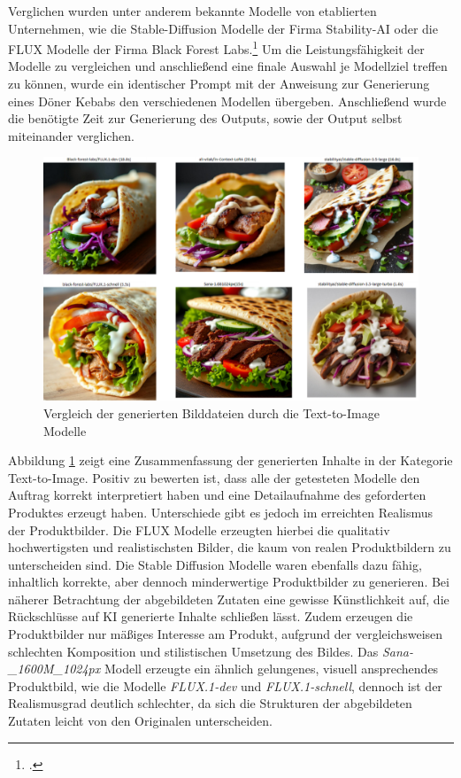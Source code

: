 Verglichen wurden unter anderem bekannte Modelle von etablierten Unternehmen, wie die Stable-Diffusion Modelle der Firma Stability-AI oder die FLUX Modelle der Firma Black Forest Labs.\footcite{stabilityai,blackforestlabs}
Um die Leistungsfähigkeit der Modelle zu vergleichen und anschließend eine finale Auswahl je Modellziel treffen zu können, wurde ein identischer Prompt mit der Anweisung zur Generierung eines Döner Kebabs den verschiedenen Modellen übergeben.
Anschließend wurde die benötigte Zeit zur Generierung des Outputs, sowie der Output selbst miteinander verglichen.
\clearpage
\begin{figure}[htbp]
    \centering
    \includegraphics[width=\textwidth]{abbildungen/Results_image_generation}
    \caption{Vergleich der generierten Bilddateien durch die Text-to-Image Modelle}
    \label{fig:results_image_generation}
\end{figure}
Abbildung \ref{fig:results_image_generation} zeigt eine Zusammenfassung der generierten Inhalte in der Kategorie Text-to-Image.
Positiv zu bewerten ist, dass alle der getesteten Modelle den Auftrag korrekt interpretiert haben und eine Detailaufnahme des geforderten Produktes erzeugt haben.
Unterschiede gibt es jedoch im erreichten Realismus der Produktbilder.
Die FLUX Modelle erzeugten hierbei die qualitativ hochwertigsten und realistischsten Bilder, die kaum von realen Produktbildern zu unterscheiden sind.
Die Stable Diffusion Modelle waren ebenfalls dazu fähig, inhaltlich korrekte, aber dennoch minderwertige Produktbilder zu generieren.
Bei näherer Betrachtung der abgebildeten Zutaten eine gewisse Künstlichkeit auf, die Rückschlüsse auf KI generierte Inhalte schließen lässt.
Zudem erzeugen die Produktbilder nur mäßiges Interesse am Produkt, aufgrund der vergleichsweisen schlechten Komposition und stilistischen Umsetzung des Bildes.
Das \textit{Sana-\_1600M\_1024px} Modell erzeugte ein ähnlich gelungenes, visuell ansprechendes Produktbild, wie die Modelle \textit{FLUX.1-dev} und \textit{FLUX.1-schnell}, dennoch ist der Realismusgrad deutlich schlechter, da sich die Strukturen der abgebildeten Zutaten leicht von den Originalen unterscheiden.

